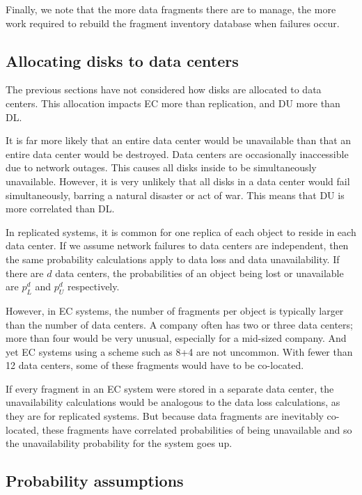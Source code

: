 \documentclass[11pt]{article}
\begin{document}
Finally, we note that the more data fragments there are to manage, the more work required to rebuild the fragment inventory database when failures occur.

\subsection{Allocating disks to data centers} \label{DC}

The previous sections have not considered how disks are allocated to data centers. This allocation impacts EC more than replication, and DU more than DL.

It is far more likely that an entire data center would be unavailable than that an entire data center would be destroyed. Data centers are occasionally inaccessible due to network outages. This causes all disks inside to be simultaneously unavailable. However, it is very unlikely that all disks in a data center would fail simultaneously, barring a natural disaster or act of war. This means that DU is more correlated than DL.

In replicated systems, it is common for one replica of each object to reside in each data center. If we assume network failures to data centers are independent, then the same probability calculations apply to data loss and data unavailability. If there are $d$ data centers, the probabilities of an object being lost or unavailable are $p_L^d$ and $p_U^d$ respectively.

However, in EC systems, the number of fragments per object is typically larger than the number of data centers. A company often has two or three data centers; more than four would be very unusual, especially for a mid-sized company. And yet EC systems using a scheme such as 8+4 are not uncommon. With fewer than 12 data centers, some of these fragments would have to be co-located.

If every fragment in an EC system were stored in a separate data center, the unavailability calculations would be analogous to the data loss calculations, as they are for replicated systems. But because data fragments are inevitably co-located, these fragments have correlated probabilities of being unavailable and so the unavailability probability for the system goes up. 

\subsection{Probability assumptions}
\end{document}
